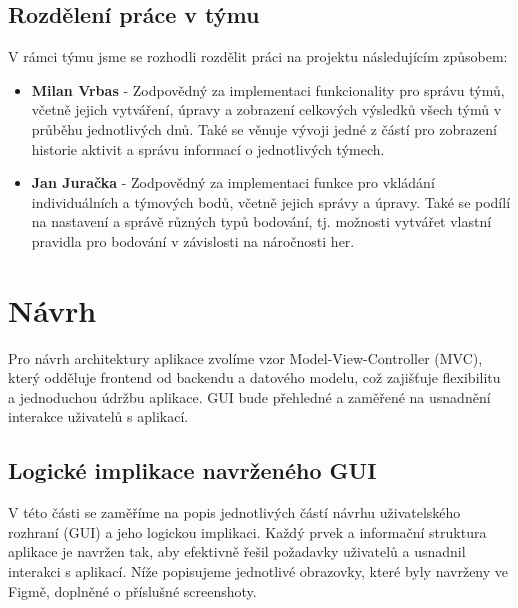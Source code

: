 \documentclass[a4paper, 12pt]{article} %
\begin{document}
\subsection*{Rozdělení práce v týmu}

V rámci týmu jsme se rozhodli rozdělit práci na projektu následujícím způsobem:

\begin{itemize}
    \item \textbf{Milan Vrbas} - Zodpovědný za implementaci funkcionality pro správu týmů, 
    včetně jejich vytváření, úpravy a zobrazení celkových výsledků všech týmů v průběhu 
    jednotlivých dnů. Také se věnuje vývoji jedné z částí pro zobrazení historie aktivit a správu 
    informací o jednotlivých týmech.
    
    \item \textbf{Jan Juračka} - Zodpovědný za implementaci funkce pro vkládání individuálních 
    a týmových bodů, včetně jejich správy a úpravy. Také se podílí na nastavení a správě 
    různých typů bodování, tj. možnosti vytvářet vlastní pravidla pro bodování v závislosti 
    na náročnosti her.
\end{itemize}

\section{Návrh}

Pro návrh architektury aplikace zvolíme vzor Model-View-Controller (MVC), který odděluje 
frontend od backendu a datového modelu, což zajišťuje flexibilitu a jednoduchou údržbu 
aplikace. GUI bude přehledné a zaměřené na usnadnění interakce uživatelů s aplikací.

\subsection{Logické implikace navrženého GUI}

V této části se zaměříme na popis jednotlivých částí návrhu uživatelského rozhraní (GUI) a jeho 
logickou implikaci. Každý prvek a informační struktura aplikace je navržen tak, aby efektivně 
řešil požadavky uživatelů a usnadnil interakci s aplikací. Níže popisujeme jednotlivé 
obrazovky, které byly navrženy ve Figmě, doplněné o příslušné screenshoty.

\newpage
\end{document}
